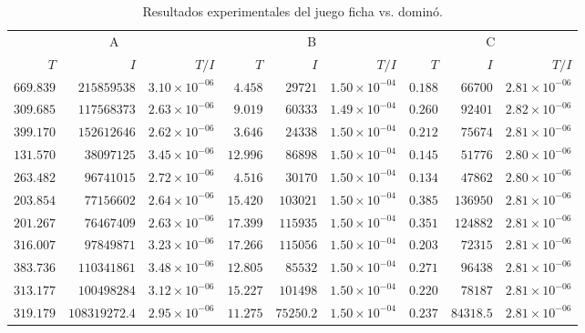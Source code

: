 \begin{table}[h]
    \centering
    \caption{Resultados experimentales del juego ficha vs. dominó.}
    \label{tab:resultados-domino}
    \scriptsize
    \begin{tabular}{r r r r r r r r r}
    \toprule
    \multicolumn{3}{c}{A} & \multicolumn{3}{c}{B} & \multicolumn{3}{c}{C} \\ \cmidrule(r){1-3} \cmidrule(lr){4-6} \cmidrule(l){7-9}
    $T$ & $I$ & $T/I$ & $T$ & $I$ & $T/I$ & $T$ & $I$ & $T/I$ \\ \cmidrule(r){1-3} \cmidrule(lr){4-6} \cmidrule(l){7-9}
	$669.839$ & $215859538$ & $3.10 {\times} 10^{-06}$ & $4.458$ & $29721$ & $1.50 {\times} 10^{-04}$ & $0.188$ & $66700$ & $2.81 {\times} 10^{-06}$ \\
	$309.685$ & $117568373$ & $2.63 {\times} 10^{-06}$ & $9.019$ & $60333$ & $1.49 {\times} 10^{-04}$ & $0.260$ & $92401$ & $2.82 {\times} 10^{-06}$ \\
	$399.170$ & $152612646$ & $2.62 {\times} 10^{-06}$ & $3.646$ & $24338$ & $1.50 {\times} 10^{-04}$ & $0.212$ & $75674$ & $2.81 {\times} 10^{-06}$ \\
	$131.570$ & $38097125$ & $3.45 {\times} 10^{-06}$ & $12.996$ & $86898$ & $1.50 {\times} 10^{-04}$ & $0.145$ & $51776$ & $2.80 {\times} 10^{-06}$ \\
	$263.482$ & $96741015$ & $2.72 {\times} 10^{-06}$ & $4.516$ & $30170$ & $1.50 {\times} 10^{-04}$ & $0.134$ & $47862$ & $2.80 {\times} 10^{-06}$ \\
	$203.854$ & $77156602$ & $2.64 {\times} 10^{-06}$ & $15.420$ & $103021$ & $1.50 {\times} 10^{-04}$ & $0.385$ & $136950$ & $2.81 {\times} 10^{-06}$ \\
	$201.267$ & $76467409$ & $2.63 {\times} 10^{-06}$ & $17.399$ & $115935$ & $1.50 {\times} 10^{-04}$ & $0.351$ & $124882$ & $2.81 {\times} 10^{-06}$ \\
	$316.007$ & $97849871$ & $3.23 {\times} 10^{-06}$ & $17.266$ & $115056$ & $1.50 {\times} 10^{-04}$ & $0.203$ & $72315$ & $2.81 {\times} 10^{-06}$ \\
	$383.736$ & $110341861$ & $3.48 {\times} 10^{-06}$ & $12.805$ & $85532$ & $1.50 {\times} 10^{-04}$ & $0.271$ & $96438$ & $2.81 {\times} 10^{-06}$ \\
	$313.177$ & $100498284$ & $3.12 {\times} 10^{-06}$ & $15.227$ & $101498$ & $1.50 {\times} 10^{-04}$ & $0.220$ & $78187$ & $2.81 {\times} 10^{-06}$ \\ \cmidrule(r){1-3} \cmidrule(lr){4-6} \cmidrule(l){7-9}
	$319.179$ & $108319272.4$ & $2.95 {\times} 10^{-06}$ & $11.275$ & $75250.2$ & $1.50 {\times} 10^{-04}$ & $0.237$ & $84318.5$ & $2.81 {\times} 10^{-06}$ \\ \bottomrule
    \end{tabular}
\end{table}


